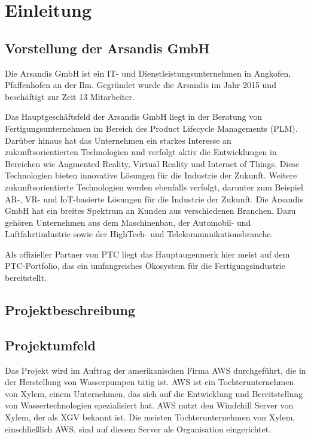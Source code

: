 \section{Einleitung}
\label{sec:Einleitung}

\subsection{Vorstellung der Arsandis GmbH}
\label{sec:Vorstellung_Arsandis}
Die Arsandis GmbH ist ein IT- und Dienstleistungsunternehmen in Angkofen, Pfaffenhofen an der Ilm.
Gegründet wurde die Arsandis im Jahr 2015 und beschäftigt zur Zeit 13 Mitarbeiter.

Das Hauptgeschäftsfeld der Arsandis GmbH liegt in der Beratung von Fertigungsunternehmen im Bereich des Product Lifecycle Managements (PLM).
Darüber hinaus hat das Unternehmen ein starkes Interesse an zukunftsorientierten Technologien und verfolgt aktiv die Entwicklungen in Bereichen wie Augmented Reality, Virtual Reality und Internet of Things.
Diese Technologien bieten innovative Lösungen für die Industrie der Zukunft.
Weitere zukunftsorientierte Technologien werden ebenfalls verfolgt, darunter zum Beispiel AR-, VR- und IoT-basierte Lösungen für die Industrie der Zukunft.
Die Arsandis GmbH hat ein breites Spektrum an Kunden aus verschiedenen Branchen.
Dazu gehören Unternehmen aus dem Maschinenbau, der Automobil- und Luftfahrtindustrie sowie der HighTech- und Telekommunikationsbranche.

Als offizieller Partner von \acs{PTC}  liegt das Hauptaugenmerk hier meist auf dem \acs{PTC}-Portfolio, das ein umfangreiches Ökosystem für die Fertigungsindustrie bereitstellt.

\subsection{Projektbeschreibung}
\label{subsec:Projektbeschreibung}

\subsection{Projektumfeld}
\label{sec:Projektumfeld}
Das Projekt wird im Auftrag der amerikanischen Firma \ac{AWS} durchgeführt, die in der Herstellung von Wasserpumpen tätig ist.
\ac{AWS} ist ein Tochterunternehmen von Xylem, einem Unternehmen, das sich auf die Entwicklung und Bereitstellung von Wassertechnologien spezialisiert hat.
\ac{AWS} nutzt den Windchill Server von Xylem, der als \ac{XGV} bekannt ist.
Die meisten Tochterunternehmen von Xylem, einschließlich \ac{AWS}, sind auf diesem Server als Organisation eingerichtet.

